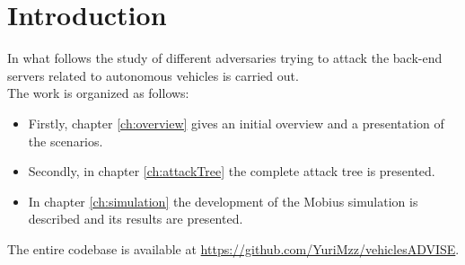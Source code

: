 %
\chapter{Introduction}\label{ch:introduction}
In what follows the study of different adversaries trying to attack the back-end servers related to autonomous vehicles is carried out.\\

The work is organized as follows:
\begin{itemize}
    \item Firstly, chapter \ref{ch:overview} gives an initial overview and a presentation of the scenarios.
    \item Secondly, in chapter \ref{ch:attackTree} the complete attack tree is presented.
    \item In chapter \ref{ch:simulation} the development of the Mobius simulation is described and its results are presented.
\end{itemize}
    
\noindent
The entire codebase is available at \url{https://github.com/YuriMzz/vehiclesADVISE}.
